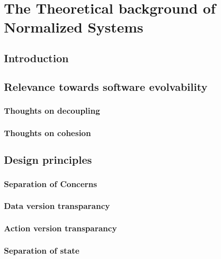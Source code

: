 \section{The Theoretical background of Normalized Systems} \label{ns_theory}

\subsection{Introduction}
\lipsum[1-1]

\subsection{Relevance towards software evolvability}
\lipsum[1-1]

\subsubsection{Thoughts on decoupling}
\lipsum[1-1]

\subsubsection{Thoughts on cohesion}
\lipsum[1-1]

\subsection{Design principles}
\lipsum[1-1]

\subsubsection{Separation of Concerns}
\lipsum[1-1]

\subsubsection{Data version transparancy}
\lipsum[1-1]

\subsubsection{Action version transparancy}
\lipsum[1-1]

\subsubsection{Separation of state}
\lipsum[1-1]